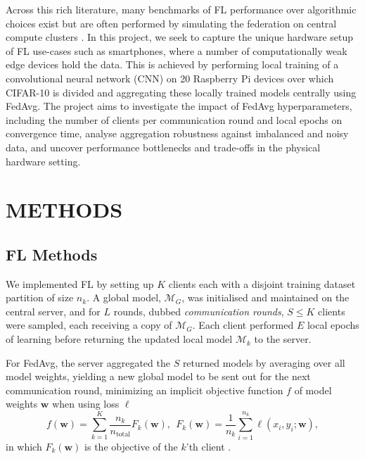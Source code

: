 \documentclass{article}
\begin{document}
Across this rich literature, many benchmarks of FL performance over algorithmic choices exist but are often performed by simulating the federation on central compute clusters \cite{lin2020ensemble}.
In this project, we seek to capture the unique hardware setup of FL use-cases such as smartphones, where a number of computationally weak edge devices hold the data.
This is achieved by performing local training of a convolutional neural network (CNN) on 20 Raspberry Pi devices over which CIFAR-10 \cite{alex2009learning} is divided and aggregating these locally trained models centrally using FedAvg.
The project aims to investigate the impact of FedAvg hyperparameters, including the number of clients per communication round and local epochs on convergence time, analyse aggregation robustness against imbalanced and noisy data, and uncover performance bottlenecks and trade-offs in the physical hardware setting.

\section{METHODS}%
\label{sec:methods}

\subsection{FL Methods}
We implemented FL by setting up $K$ clients each with a disjoint training dataset partition of size $n_k$.
A global model, $\mathcal M_G$, was initialised and maintained on the central server, and for $L$ rounds, dubbed \emph{communication rounds}, $S \leq K$ clients were sampled, each receiving a copy of $\mathcal M_G$.
Each client performed $E$ local epochs of learning before returning the updated local model $\mathcal M_k$ to the server.

For FedAvg, the server aggregated the $S$ returned models by averaging over all model weights, yielding a new global model to be sent out for the next communication round, minimizing an implicit objective function $f$ of model weights $\mathbf w$ when using loss $\ell$
\begin{equation*}
    f(\mathbf w) = \sum_{k=1}^K \frac{n_k}{n_{\text{total}}} F_k(\mathbf w),\ \ 
    F_k(\mathbf w) = \frac 1 {n_k} \sum_{i=1}^{n_k} \ell (x_i, y_i; \mathbf w),
\end{equation*}
in which $F_k(\mathbf w)$ is the objective of the $k$'th client \cite{mcmahan2017communication}.
\end{document}
